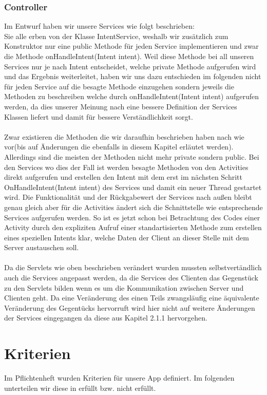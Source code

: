 \documentclass{scrartcl}
\begin{document}
	\subsubsection{Controller}
	Im Entwurf haben wir unsere Services wie folgt beschrieben: 
\\
Sie alle erben von der Klasse IntentService, weshalb wir zusätzlich zum Konstruktor nur eine public Methode für jeden Service implementieren und zwar die Methode onHandleIntent(Intent intent). Weil diese Methode bei all unseren Services nur je nach Intent entscheidet, welche private Methode aufgerufen wird und das Ergebnis weiterleitet, haben wir uns dazu entschieden im folgenden nicht für jeden Service auf die besagte Methode einzugehen sondern jeweils die Methoden zu beschreiben welche durch onHandleIntent(Intent intent) aufgerufen werden, da dies unserer Meinung nach eine bessere Definition der Services Klassen liefert und damit für bessere Verständlichkeit sorgt.
\\
\\
Zwar existieren die Methoden die wir daraufhin beschrieben haben nach wie vor(bis auf Änderungen die ebenfalls in diesem Kapitel erläutet werden).
Allerdings sind die meisten der Methoden nicht mehr private sondern public. Bei den Services wo dies der Fall ist werden besagte Methoden von den Activities direkt aufgerufen und erstellen den Intent mit dem erst im nächsten Schritt OnHandleIntent(Intent intent) des Services und damit ein neuer Thread gestartet wird. 
Die Funktionalität und der Rückgabewert der Services nach außen bleibt genau gleich aber für die Activities ändert sich die Schnittstelle wie entsprechende Services aufgerufen werden.
So ist es jetzt schon bei Betrachtung des Codes einer Activity durch den expliziten Aufruf einer standartisierten Methode zum erstellen eines speziellen Intents klar, welche Daten der Client an dieser Stelle mit dem Server austauschen soll.    
\\
\\
Da die Servlets wie oben beschrieben verändert wurden mussten selbstvertändlich auch die Services angepasst werden, da die Services des Clienten das Gegenstück zu den Servlets bilden wenn es um die Kommunikation zwischen Server und Clienten geht.
Da eine Veränderung des einen Teils zwangsläufig eine äquivalente Veränderung des Gegentücks hervorruft wird hier nicht auf weitere Änderungen der Services eingegangen da diese aus Kapitel 2.1.1 hervorgehen.

	\newpage
	\section{Kriterien}
	Im Pflichtenheft wurden Kriterien für unsere App definiert. Im folgenden unterteilen wir diese in erfüllt bzw. nicht erfüllt.
\end{document}
